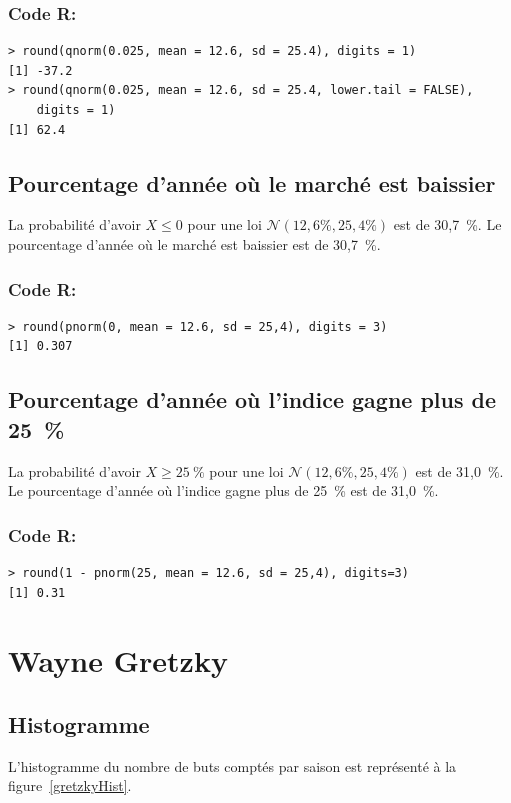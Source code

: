 \documentclass[10pt,twocolumn]{article}
\begin{document}
\subsubsection*{Code R:}
\begin{verbatim}
> round(qnorm(0.025, mean = 12.6, sd = 25.4), digits = 1)
[1] -37.2
> round(qnorm(0.025, mean = 12.6, sd = 25.4, lower.tail = FALSE),
    digits = 1)
[1] 62.4
\end{verbatim}


\subsection{Pourcentage d’année où le marché est baissier}
La probabilité d’avoir $X \leq 0$ pour une loi $\mathcal{N}(12,6 \%, 25,4\%)$ est de 30,7~\%. Le pourcentage d’année où le marché est baissier est de 30,7~\%.

\subsubsection*{Code R:}
\begin{verbatim}
> round(pnorm(0, mean = 12.6, sd = 25,4), digits = 3)
[1] 0.307
\end{verbatim}


\subsection{Pourcentage d’année où l’indice gagne plus de 25~\%}
La probabilité d’avoir $X \geq 25~\%$ pour une loi $\mathcal{N}(12,6 \%, 25,4\%)$ est de 31,0~\%. Le pourcentage d’année où l’indice gagne plus de 25~\% est de 31,0~\%.

\subsubsection*{Code R:}
\begin{verbatim}
> round(1 - pnorm(25, mean = 12.6, sd = 25,4), digits=3)
[1] 0.31
\end{verbatim}



\section{Wayne Gretzky}
\subsection{Histogramme}
L’histogramme du nombre de buts comptés par saison est représenté à la figure~\ref{gretzkyHist}.
\end{document}
